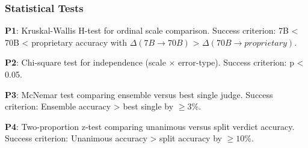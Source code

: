 \subsubsection{Statistical Tests}

\textbf{P1}: Kruskal-Wallis H-test for ordinal scale comparison. Success criterion: 7B < 70B < proprietary accuracy with $\Delta (7B\rightarrow 70B)$ > $\Delta (70B\rightarrow proprietary)$.

\textbf{P2}: Chi-square test for independence (scale $\times$ error-type). Success criterion: p < 0.05.

\textbf{P3}: McNemar test comparing ensemble versus best single judge. Success criterion: Ensemble accuracy > best single by $\geq 3$\%.

\textbf{P4}: Two-proportion z-test comparing unanimous versus split verdict accuracy. Success criterion: Unanimous accuracy > split accuracy by $\geq 10$\%.

